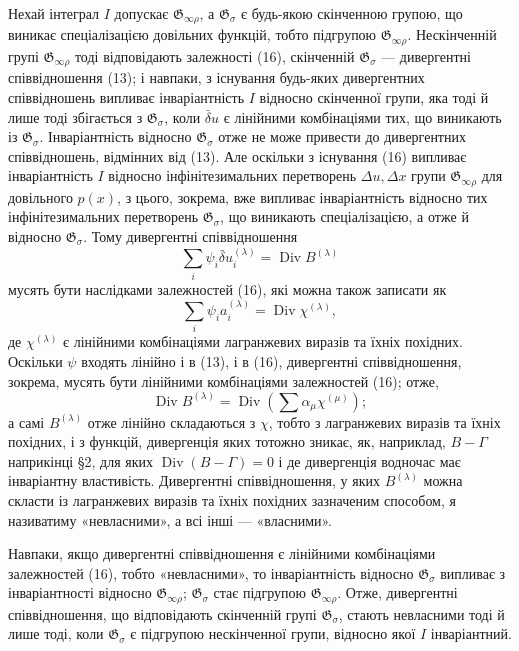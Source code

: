 \documentclass[11pt]{article}
\providecommand{\G}{\mathfrak G}
\providecommand{\D}{\Delta}
\DeclareMathOperator{\Div}{Div}
\providecommand{\bd}{\bar{\delta}}
\begin{document}
Нехай інтеграл \(I\) допускає \(\G_{\infty\rho}\), а \(\G_\sigma\) є будь-якою скінченною групою, що виникає спеціалізацією довільних функцій, тобто підгрупою \(\G_{\infty\rho}\). Нескінченній групі \(\G_{\infty\rho}\) тоді відповідають залежності (16), скінченній \(\G_\sigma\) --- дивергентні співвідношення (13); і навпаки, з існування будь-яких дивергентних співвідношень випливає інваріантність \(I\) відносно скінченної групи, яка тоді й лише тоді збігається з \(\G_\sigma\), коли \(\bd u\) є лінійними комбінаціями тих, що виникають із \(\G_\sigma\). Інваріантність відносно \(\G_\sigma\) отже не може привести до дивергентних співвідношень, відмінних від (13). Але оскільки з існування (16) випливає інваріантність \(I\) відносно інфінітезимальних перетворень \(\D u,\D x\) групи \(\G_{\infty\rho}\) для довільного \(p(x)\), з цього, зокрема, вже випливає інваріантність відносно тих інфінітезимальних перетворень \(\G_\sigma\), що виникають спеціалізацією, а отже й відносно \(\G_\sigma\). Тому дивергентні співвідношення
\[
\sum_i\psi_i\bd u_i^{(\lambda)}=\Div B^{(\lambda)}
\]
мусять бути наслідками залежностей (16), які можна також записати як
\[
\sum_i\psi_i a_i^{(\lambda)}=\Div\chi^{(\lambda)},
\]
де \(\chi^{(\lambda)}\) є лінійними комбінаціями лагранжевих виразів та їхніх похідних. Оскільки \(\psi\) входять лінійно і в (13), і в (16), дивергентні співвідношення, зокрема, мусять бути лінійними комбінаціями залежностей (16); отже,
\[
\Div B^{(\lambda)}=\Div\left(\sum \alpha_\mu\chi^{(\mu)}\right);
\]
а самі \(B^{(\lambda)}\) отже лінійно складаються з \(\chi\), тобто з лагранжевих виразів та їхніх похідних, і з функцій, дивергенція яких тотожно зникає, як, наприклад, \(B-\Gamma\) наприкінці \S{}2, для яких \(\Div(B-\Gamma)=0\) і де дивергенція водночас має інваріантну властивість. Дивергентні співвідношення, у яких \(B^{(\lambda)}\) можна скласти із лагранжевих виразів та їхніх похідних зазначеним способом, я називатиму «невласними», а всі інші --- «власними».

Навпаки, якщо дивергентні співвідношення є лінійними комбінаціями залежностей (16), тобто «невласними», то інваріантність відносно \(\G_\sigma\) випливає з інваріантності відносно \(\G_{\infty\rho}\); \(\G_\sigma\) стає підгрупою \(\G_{\infty\rho}\). Отже, дивергентні співвідношення, що відповідають скінченній групі \(\G_\sigma\), стають невласними тоді й лише тоді, коли \(\G_\sigma\) є підгрупою нескінченної групи, відносно якої \(I\) інваріантний.
\end{document}
